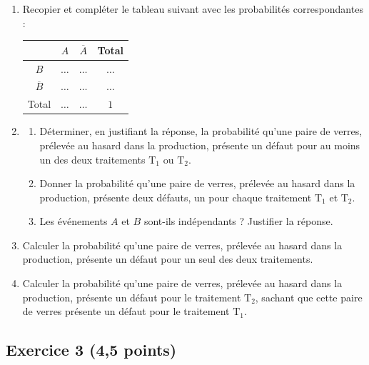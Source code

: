 \documentclass[11pt,a4paper]{article}
\begin{document}
\begin{enumerate}
    \item Recopier et compléter le tableau suivant avec les probabilités correspondantes :
    \begin{center}
    \renewcommand{\arraystretch}{1.3}
    \begin{tabular}{|c|c|c|c|}
        \hline
        & $A$ & $\overline{A}$ & Total \\
        \hline
        $B$ & $\dots$ & $\dots$ & $\dots$ \\
        \hline
        $\overline{B}$ & $\dots$ & $\dots$ & $\dots$ \\
        \hline
        Total & $\dots$ & $\dots$ & $1$ \\
        \hline
    \end{tabular}
    \end{center}
    \item 
    \begin{enumerate}
        \item Déterminer, en justifiant la réponse, la probabilité qu'une paire de verres, prélevée au hasard dans la production, présente un défaut pour au moins un des deux traitements $\mathrm{T}_1$ ou $\mathrm{T}_2$.
        \item Donner la probabilité qu'une paire de verres, prélevée au hasard dans la production, présente deux défauts, un pour chaque traitement $\mathrm{T}_1$ et $\mathrm{T}_2$.
        \item Les événements $A$ et $B$ sont-ils indépendants ? Justifier la réponse.
    \end{enumerate}
    \item Calculer la probabilité qu'une paire de verres, prélevée au hasard dans la production, présente un défaut pour un seul des deux traitements.
    \item Calculer la probabilité qu'une paire de verres, prélevée au hasard dans la production, présente un défaut pour le traitement $\mathrm{T}_2$, sachant que cette paire de verres présente un défaut pour le traitement $\mathrm{T}_1$.
\end{enumerate}

\vspace{0.3cm}

\subsection*{Exercice 3 \hfill (4,5 points)}
\end{document}
